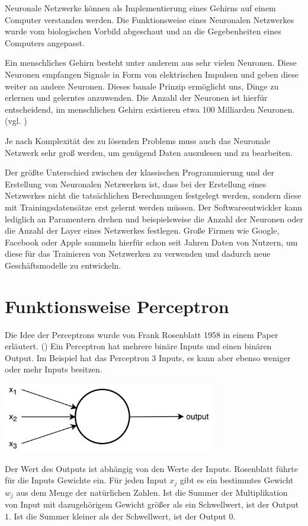 \documentclass[../main.tex]{subfiles}
\begin{document}
Neuronale Netzwerke können als Implementierung eines Gehirns auf einem Computer verstanden werden. Die Funktionsweise eines Neuronalen Netzwerkes wurde vom biologischen Vorbild abgeschaut und an die Gegebenheiten eines Computers angepasst. 

Ein menschliches Gehirn besteht unter anderem aus sehr vielen Neuronen. Diese Neuronen empfangen Signale in Form von elektrischen Impulsen und geben diese weiter an andere Neuronen. Dieses banale Prinzip ermöglicht uns, Dinge zu erlernen und gelerntes anzuwenden. Die Anzahl der Neuronen ist hierfür entscheidend, im menschlichen Gehirn existieren etwa 100 Milliarden Neuronen. (vgl. \cite{articleKuenstlichesGehirn})

Je nach Komplexität des zu lösenden Problems muss auch das Neuronale Netzwerk sehr groß werden, um genügend Daten auszulesen und zu bearbeiten.

Der größte Unterschied zwischen der klassischen Programmierung und der Erstellung von Neuronalen Netzwerken ist, dass bei der Erstellung eines Netzwerkes nicht die tatsächlichen Berechnungen festgelegt werden, sondern diese mit Trainingsdatensätze erst gelernt werden müssen. Der Softwareentwickler kann lediglich an Paramentern drehen und beispielsweise die Anzahl der Neuronen oder die Anzahl der Layer eines Netzwerkes festlegen.
Große Firmen wie Google, Facebook oder Apple sammeln hierfür schon seit Jahren Daten von Nutzern, um diese für das Trainieren von Netzwerken zu verwenden und dadurch neue Geschäftsmodelle zu entwickeln.

\section{Funktionsweise Perceptron}
Die Idee der Perceptrons wurde von Frank Rosenblatt 1958 in einem Paper erläutert. (\cite{paperPerceptron}) 
Ein Perceptron hat mehrere binäre Inputs und einen binären Output. Im Beispiel hat das Perceptron $3$ Inputs, es kann aber ebenso weniger oder mehr Inputs besitzen.

\includegraphics[width=0.7\textwidth, center]{../images/Benz/perceptron.png}

Der Wert des Outputs ist abhängig von den Werte der Inputs. Rosenblatt führte für die Inputs Gewichte ein. Für jeden Input \(x_{j}\) gibt es ein bestimmtes Gewicht \(w_{j}\) aus dem Menge der natürlichen Zahlen. Ist die Summer der Multiplikation von Input mit dazugehörigem Gewicht größer als ein Schwellwert, ist der Output $1$. Ist die Summer kleiner als der Schwellwert, ist der Output $0$.
\end{document}
